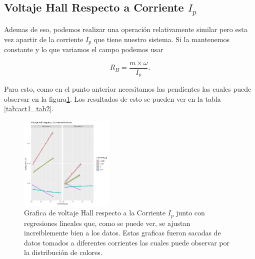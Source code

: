 \documentclass[a4paper, amsfonts, amssymb, amsmath, reprint, showkeys, nofootinbib, twoside]{revtex4-1}
\begin{document}
\subsection{Voltaje Hall Respecto a Corriente $I_p$}
Ademas de eso, podemos realizar una operación relativamente similar pero esta vez apartir de la corriente $I_p$ que tiene nuestro sistema. Si la mantenemos constante y lo que variamos el campo podemos usar

\begin{equation}
  R_H = \frac{m \times \omega}{I_p}.
  \label{eq:sec2_eq2}
\end{equation}

Para esto, como en el punto anterior necesitamos las pendientes las cuales puede observar en la figura\ref{fig:act2_fig2}. Los resultados de esto se pueden ver en la tabla \ref{tab:act1_tab2}.

\begin{figure}
  \begin{center}
    \includegraphics[width=0.4\textwidth]{./img/Act2/VoltajeHallVsCorriente.png}
  \end{center}
  \caption{Grafica de voltaje Hall respecto a la Corriente $I_p$ junto con regresiones lineales que, como se puede ver,  se ajustan increiblemente bien a los datos. Estas graficas fueron sacadas de datos tomados a diferentes corrientes las cuales puede observar por la distribución de colores.}\label{fig:act2_fig2}
\end{figure}
\end{document}
